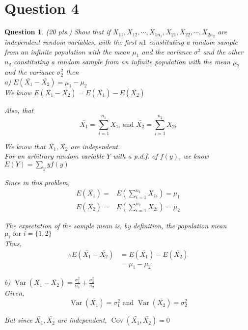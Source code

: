 \documentclass{article}
\theoremstyle{questionstyle}
\newtheorem{myquestion}{Question}
\begin{document}
\section{Question 4}
\begin{myquestion}
(20 pts.) Show that if \(X_{11}, X_{12}, \cdots , X_{1n_1} , X_{21}, X_{22}, \cdots , X_{2n_2}\) are independent random variables, with the first $n1$ constituting a random sample from an infinite population with
the mean $\mu_1$ and the variance $\sigma^2$ and the other $n_2$ constituting a random sample from an infinite
population with the mean $\mu_2$ and the variance $\sigma_2^2$ then\\

a) \(E(\bar{X_1} - \bar{X_2}) = \mu_1 - \mu_2\)\\

We know \(E(\bar{X_1} - \bar{X_2}) = E(\bar{X_1}) - E(\bar{X_2})\)

Also, that \[\bar{X_1}= \sum_{i=1}^{n_1} X_{1i} \text{ and } \bar{X_2}= \sum_{i=1}^{n_2} X_{2i}\]

We know that \(\bar{X_{1}},\bar{X_{2}}\) are independent.\\

For an arbitrary random variable \(Y\) with a p.d.f. of \(f(y)\), we know \(E(Y) = \sum_{y}yf(y)\)

Since in this problem, 
\begin{align*}
    E(\bar{X_1}) =&  E\left(\sum_{i=1}^{n_1} X_{1i} \right) = \mu_1\\
    E(\bar{X_2}) =&  E\left(\sum_{i=1}^{n_2} X_{2i} \right) = \mu_2
\end{align*}

The expectation of the sample mean is, by definition, the population mean \(\mu_i \text{ for } i = \{1,2\}\)\\

Thus, 
\begin{align*}
    \therefore E(\bar{X_{1}}-\bar{X_{2}}) &= E(\bar{X_1}) - E(\bar{X_2})\\ &= \mu_1 - \mu_2 
\end{align*}


b) $\operatorname{Var}(\bar{X_1} - \bar{X_2}) = \frac{\sigma_1^2}{n_1} + \frac{\sigma_2^2}{n_2}$\\

Given,
\[ \operatorname{Var}(\bar{X_1}) = \sigma_1^2 \text{ and } \operatorname{Var}(\bar{X_2}) = \sigma_2^2\]

But since \(\bar{X_{1}},\bar{X_{2}}\) are independent, \(\operatorname{Cov}(\bar{X_1}, \bar{X_2}) = 0\)


\end{myquestion}
\end{document}
